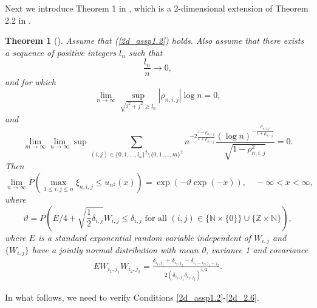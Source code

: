 \documentclass{article}
\newtheorem{theorem}{Theorem}%
\begin{document}
Next we introduce Theorem 1 in \citet{french2013asymptotic}, which is a 2-dimensional extension of Theorem  2.2 in \citet{hsing1996extremes}. 
\begin{theorem}[\citet{french2013asymptotic}]
	\label{2d_thm2.2}
	Assume that (\ref{2d_assp1.2}) holds. Also assume that there  exists a sequence of positive integers $l_n$ such that 
	\begin{equation}
		\label{2d_2.1}
		\frac{l_n}{n}\rightarrow0,
	\end{equation}
	and for which 
	\begin{equation}
		\label{2d_2.5}
		\lim_{n \to \infty} \sup_{\sqrt{i^2+j^2} \geq l_n} |\rho_{n,i,j}| \log n = 0,
	\end{equation}
	and
	\begin{equation}
		\label{2d_2.6}	\lim_{m \to \infty} \lim_{n \to \infty} \sup \sum_{(i,j) \in \{0,1,...,l_n\}^2 \setminus \{0,1,...,m\}^2} n^{-2\frac{1-\rho_{n,i,j}}{1+\rho_{n,i,j}}} \frac{\left( \log n \right)^{-\frac{\rho_{n,i,j}}{1+\rho_{n,i,j}}}}{\sqrt{1-\rho^2_{n,i,j}}}   = 0.
	\end{equation}
	Then
	\begin{equation}
		\label{2d_lim}
		\lim_{n\rightarrow\infty}P(\max_{1\leq i,j\leq n}\xi_{n,i,j}\leq u_{n^2}(x))=\exp(-\vartheta\exp(-x)),\quad -\infty<x<\infty,
	\end{equation}
	where
	\begin{equation*}
		\vartheta=P(E/4+\sqrt{\frac{1}{2}\delta_{i,j}}W_{i,j}\leq\delta_{i,j}\text{ for all }(i,j) \in \{\mathbb{N} \times \{0\}\} \cup \{\mathbb{Z} \times \mathbb{N}\}),
	\end{equation*}
	where $E$ is a standard exponential random variable independent of $W_{i,j}$ and $\{W_{i,j}\}$ have a jointly normal distribution with mean 0, variance 1 and covariance
	\begin{equation}
		\begin{aligned}
			\label{2d_2.4}
			EW_{i_1,j_1}W_{i_2,j_2}=\frac{\delta_{i_1,j_1}+\delta_{i_2,j_2}-\delta_{i_1-i_2,j_1-j_2}}{2(\delta_{i_1,j_1}\delta_{i_2,j_2})^{1/2}}.
		\end{aligned}
	\end{equation}
\end{theorem}

In what  follows, we need to verify Conditions \eqref{2d_assp1.2}-\eqref{2d_2.6}.
\end{document}
